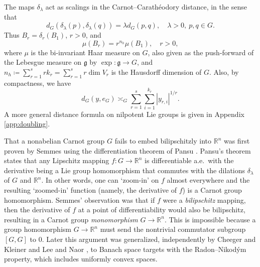 \documentclass[11pt,reqno]{amsart}
\newcommand{\1}{\mathbf 1}
\begin{document}
The maps $\delta_\lambda$ act as scalings in the Carnot--Carath\'eodory distance, in the sense that
\[
d_G\left(\delta_\lambda\left(p\right),\delta_\lambda\left(q\right)\right)=\lambda d_G\left(p,q\right), \quad \lambda>0,~p,q\in G.
\]
Thus $B_r=\delta_r\left(B_1\right)$, $r>0$, and
\begin{equation}\label{eq:carnot-volume}
\mu\left(B_r\right)=r^{n_h}\mu\left(B_1\right), \quad r>0,
\end{equation}
where $\mu$ is the bi-invariant Haar measure on $G$, also given as the push-forward of the Lebesgue measure on $\mathfrak{g}$ by $\exp:\mathfrak{g}\to G$, and $n_h\coloneqq \sum_{r=1}^s rk_r=\sum_{r=1}^s r\operatorname{dim}V_r$ is the Hausdorff dimension of $G$. Also, by compactness, we have
\begin{equation}\label{eq:carnot-distance}
    d_G\left(y,e_G\right)\asymp_G \sum_{r=1}^s\sum_{i=1}^{k_r}\left|y_{r,i}\right|^{1/r}.
\end{equation}
A more general distance formula on nilpotent Lie groups is given in Appendix \ref{app:doubling}.


That a nonabelian Carnot group $G$ fails to embed bilipschitzly into $\mathbb{R}^n$ was first proven by Semmes \cite{semmes1996nonexistence} using the differentiation theorem of Pansu \cite{pansu1989metriques}. Pansu's theorem states that any Lipschitz mapping $f:G\to \mathbb{R}^n$ is differentiable a.e.~with the derivative being a Lie group homomorphism that commutes with the dilations $\delta_\lambda$ of $G$ and $\mathbb{R}^n$. In other words, one can `zoom-in' on $f$ almost everywhere and the resulting `zoomed-in' function (namely, the derivative of $f$) is a Carnot group homomorphism. Semmes' observation was that if $f$ were a \emph{bilipschitz} mapping, then the derivative of $f$ at a point of differentiability would also be bilipschitz, resulting in a Carnot group \emph{monomorphism} $G\to \mathbb{R}^n$. This is impossible because a group homomorphism $G\to \mathbb{R}^n$ must send the nontrivial commutator subgroup $\left[G,G\right]$ to $0$. Later this argument was generalized, independently by Cheeger and Kleiner \cite{cheeger2006differentiability} and Lee and Naor \cite{lee2006lp}, to Banach space targets with the Radon--Nikod\'ym property, which includes uniformly convex spaces.
\end{document}
